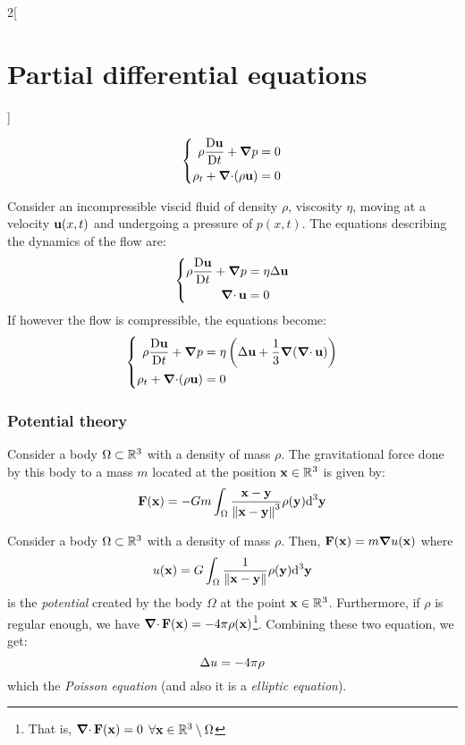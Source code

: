\documentclass[../../../main.tex]{subfiles}
\begin{document}
\begin{multicols}{2}[\section{Partial differential equations}]
\begin{theorem}
    \begin{equation*}
      \left\{
      \begin{aligned}
        \rho\frac{\mathrm{D}\boldsymbol{\mathrm{u}}}{\mathrm{D}t}+\grad p & =0 \\
        \rho_t+\operatorname{\boldsymbol{\mathrm{\nabla}}\cdot}(\rho\boldsymbol{\mathrm{u}})      & =0
      \end{aligned}
      \right.
    \end{equation*}
  \end{theorem}
  \begin{theorem}
    Consider an incompressible viscid fluid of density $\rho$, viscosity $\eta$, moving at a velocity $\boldsymbol{\mathrm{u}}(x,t)$ and undergoing a pressure of $p(x,t)$. The equations describing the dynamics of the flow are:
    \begin{equation*}
      \left\{
      \begin{aligned}
        \rho\frac{\mathrm{D}\boldsymbol{\mathrm{u}}}{\mathrm{D}t}+\grad p & =\eta\Delta\boldsymbol{\mathrm{u}} \\
        \operatorname{\boldsymbol{\mathrm{\nabla}}\cdot}{\boldsymbol{\mathrm{u}}}                 & =0
      \end{aligned}
      \right.
    \end{equation*}
    If however the flow is compressible, the equations become:
    \begin{equation*}
      \left\{
      \begin{aligned}
        \rho\frac{\mathrm{D}\boldsymbol{\mathrm{u}}}{\mathrm{D}t}+\grad p & =\eta\left(\Delta\boldsymbol{\mathrm{u}}+\frac{1}{3}\grad(\operatorname{\boldsymbol{\mathrm{\nabla}}\cdot}{\boldsymbol{\mathrm{u}}})\right) \\
        \rho_t+\operatorname{\boldsymbol{\mathrm{\nabla}}\cdot}(\rho\boldsymbol{\mathrm{u}})      & =0
      \end{aligned}
      \right.
    \end{equation*}
  \end{theorem}
  \subsubsection{Potential theory}
  \begin{proposition}
    Consider a body $\Omega\subset\mathbb{R}^3$ with a density of mass $\rho$. The gravitational force done by this body to a mass $m$ located at the position $\boldsymbol{\mathrm{x}}\in\mathbb{R}^3$ is given by:
    $$\boldsymbol{\mathrm{F}}(\boldsymbol{\mathrm{x}})=-Gm\int_{\Omega}\frac{\boldsymbol{\mathrm{x}}-\boldsymbol{\mathrm{y}}}{{\|\boldsymbol{\mathrm{x}}-\boldsymbol{\mathrm{y}}\|}^3}\rho(\boldsymbol{\mathrm{y}})\dd^3{\boldsymbol{\mathrm{y}}}$$
  \end{proposition}
  \begin{proposition}
    Consider a body $\Omega\subset\mathbb{R}^3$ with a density of mass $\rho$. Then, $\boldsymbol{\mathrm{F}}(\boldsymbol{\mathrm{x}})=m\grad{u(\boldsymbol{\mathrm{x}})}$ where $$u(\boldsymbol{\mathrm{x}})=G\int_{\Omega}\frac{1}{\|\boldsymbol{\mathrm{x}}-\boldsymbol{\mathrm{y}}\|}\rho(\boldsymbol{\mathrm{y}})\dd^3{\boldsymbol{\mathrm{y}}}$$ is the \emph{potential} created by the body $\Omega$ at the point $\boldsymbol{\mathrm{x}}\in\mathbb{R}^3$. Furthermore, if $\rho$ is regular enough, we have $\operatorname{\boldsymbol{\mathrm{\nabla}}\cdot}\boldsymbol{\mathrm{F}}(\boldsymbol{\mathrm{x}})=-4\pi\rho(\boldsymbol{\mathrm{x}})$\footnote{That is, $\operatorname{\boldsymbol{\mathrm{\nabla}}\cdot}\boldsymbol{\mathrm{F}}(\boldsymbol{\mathrm{x}})=0$ $\forall\boldsymbol{\mathrm{x}}\in\mathbb{R}^3\setminus\Omega$}. Combining these two equation, we get: $$\Delta u=-4\pi\rho$$ which the \emph{Poisson equation} (and also it is a \emph{elliptic equation}).
  \end{proposition}

\end{multicols}
\end{document}
